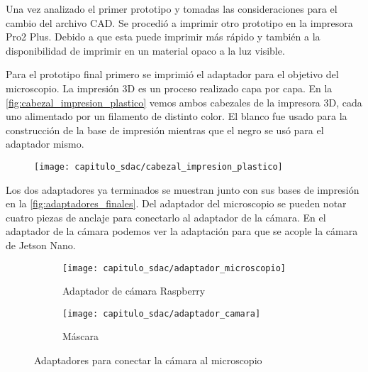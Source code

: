 Una vez analizado el primer prototipo y tomadas las consideraciones para el
cambio del archivo CAD. Se procedió a imprimir otro prototipo en la impresora
Pro2 Plus. Debido a que esta puede imprimir más rápido y también a la
disponibilidad de imprimir en un material opaco a la luz visible.



Para el prototipo final primero se imprimió el adaptador para el objetivo del
microscopio. La impresión 3D es un proceso realizado capa por capa. En la
\autoref{fig:cabezal_impresion_plastico} vemos ambos cabezales de la impresora
3D, cada uno alimentado por un filamento de distinto color. El blanco fue usado
para la construcción de la base de impresión mientras que el negro se usó para
el adaptador mismo.

\begin{figure}[H]
    \centering
    \texttt{[image: capitulo\_sdac/cabezal\_impresion\_plastico]}
    \caption{}\label{fig:cabezal_impresion_plastico}
\end{figure}

Los dos adaptadores ya terminados se muestran junto con sus bases de impresión
en la \autoref{fig:adaptadores_finales}. Del adaptador del  microscopio se
pueden notar cuatro piezas de anclaje para conectarlo al adaptador de la cámara.
En el adaptador de la cámara podemos ver la adaptación para que se acople la
cámara de Jetson Nano.

\begin{figure}[H]
    \centering
    \begin{subfigure}{.5\textwidth}
        \centering
        \texttt{[image: capitulo\_sdac/adaptador\_microscopio]}
        \caption{Adaptador de cámara Raspberry}
    \end{subfigure}%
    \begin{subfigure}{.5\textwidth}
        \centering
        \texttt{[image: capitulo\_sdac/adaptador\_camara]}
        \caption{Máscara}
    \end{subfigure}
    \caption{Adaptadores para conectar la cámara al microscopio}\label{fig:adaptadores_finales}
    \end{figure}

